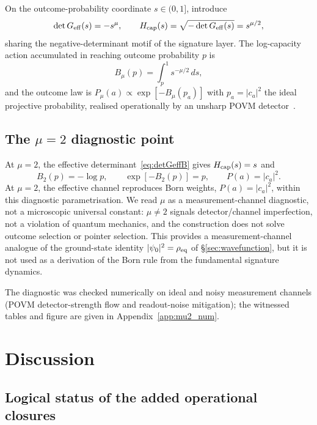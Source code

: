 \documentclass[11pt,a4paper]{article}
\theoremstyle{definition}
\begin{document}
On the outcome-probability coordinate $s\in(0,1]$, introduce
\begin{equation}
\det G_{\rm eff}(s)=-s^{\mu},\qquad
H_{\rm cap}(s)=\sqrt{-\det G_{\rm eff}(s)}=s^{\mu/2},
\label{eq:detGeffB}
\end{equation}
sharing the negative-determinant motif of the signature layer. The
log-capacity action accumulated in reaching outcome probability $p$ is
\begin{equation}
B_\mu(p)=\int_p^1 s^{-\mu/2}\,ds,
\label{eq:BmuB}
\end{equation}
and the outcome law is $P_\mu(a)\propto\exp[-B_\mu(p_a)]$ with
$p_a=|c_a|^2$ the ideal projective probability, realised operationally by
an unsharp POVM detector~\cite{Busch}.

\subsection{The $\mu=2$ diagnostic point}

At $\mu=2$, the effective determinant~\eqref{eq:detGeffB} gives $H_{\rm cap}(s)=s$ and
\begin{equation}
B_2(p)=-\log p,\qquad \exp[-B_2(p)]=p,\qquad P(a)=|c_a|^2 .
\label{eq:bornB}
\end{equation}
At $\mu=2$, the effective channel reproduces Born weights,
$P(a)=|c_a|^2$, within this diagnostic parametrisation. We read $\mu$ as a measurement-channel diagnostic, not a
microscopic universal constant: $\mu\neq2$ signals detector/channel
imperfection, not a violation of quantum mechanics, and the construction
does not solve outcome selection or pointer selection. This provides a measurement-channel analogue of the ground-state identity
$|\psi_0|^2=\rho_{\rm eq}$ of \S\ref{sec:wavefunction}, but it is not used
as a derivation of the Born rule from the fundamental signature dynamics.

The diagnostic was checked numerically on ideal and noisy measurement channels (POVM detector-strength flow and readout-noise mitigation); the witnessed tables and figure are given in Appendix~\ref{app:mu2_num}.

\section{Discussion}\label{sec:discussion}

\subsection{Logical status of the added operational closures}
\end{document}

